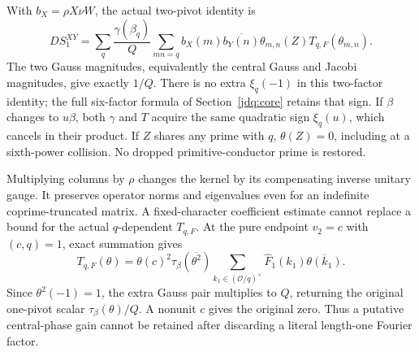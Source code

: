 With $b_X=\rho X\nu W$, the actual two-pivot identity is
\begin{equation}\label{sw:dual}
 DS_1^{XY}=\sum_q\frac{\gamma(\beta_q)}{Q}
   \sum_{mn=q} b_X(m)\overline{b_Y(n)}\theta_{m,n}(Z)
                        T_{q,F}(\theta_{m,n}).
\end{equation}
The two Gauss magnitudes, equivalently the central Gauss and Jacobi
magnitudes, give exactly $1/Q$.
There is no extra $\xi_q(-1)$ in this two-factor identity; the full
six-factor formula of Section~\ref{jdq:core} retains that sign.
If $\beta$ changes to $u\beta$, both $\gamma$ and $T$ acquire the same
quadratic sign $\xi_q(u)$, which cancels in their product.
If $Z$ shares any prime with $q$, $\theta(Z)=0$, including at a
sixth-power collision. No dropped primitive-conductor prime is restored.

Multiplying columns by $\rho$ changes the kernel by its compensating
inverse unitary gauge. It preserves operator norms and eigenvalues even
for an indefinite coprime-truncated matrix. A fixed-character coefficient
estimate cannot replace a bound for the actual $q$-dependent $T_{q,F}$.
At the pure endpoint $v_2=c$ with $(c,q)=1$, exact summation gives
\[
 T_{q,F}(\theta)=\theta(c)^2\tau_\beta(\overline{\theta^2})
       \sum_{k_1\in(\mathcal O/q)^\times}\widehat F_1(k_1)
                                      \overline{\theta(k_1)}.
\]
Since $\theta^2(-1)=1$, the extra Gauss pair multiplies to $Q$,
returning the original one-pivot scalar $\tau_\beta(\theta)/Q$.
A nonunit $c$ gives the original zero. Thus a putative central-phase gain
cannot be retained after discarding a literal length-one Fourier factor.

